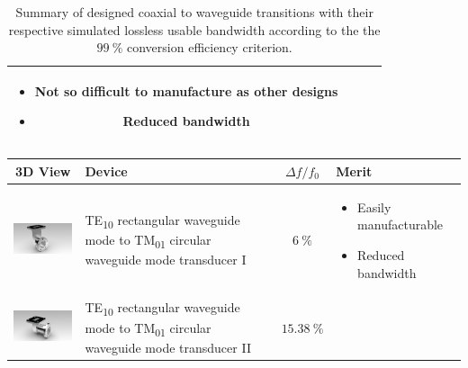 \documentclass[english,twoside]{article}
\newcommand\pro{\item[$+$]}
\newcommand\con{\item[$-$]}
\begin{document}
\begin{landscape}
\begin{table}[H]
{\begin{tabular}{c|l|c|l}
						\begin{minipage}{5cm} 
							\begin{itemize}
								\pro Not so difficult to manufacture as other designs
								\con Reduced bandwidth
							\end{itemize}
						\end{minipage}\\
						\hline
					\end{tabular}
				}			
				\caption{Summary of designed coaxial to waveguide transitions with their respective simulated lossless usable bandwidth according to the the $\SI{99}{\percent}$ conversion efficiency criterion.}
			\end{table}
			\newpage
			\begin{table}[H]
				\centering
				{\small
					\begin{tabular}{c|l|c|l}
						3D View & Device & $\Delta f / f_0$ & Merit\\
						\hline
						\includegraphics[width=3.5cm,valign=c,margin=3pt]{renders/wrToWcTM01_irises} & \begin{minipage}{7cm}TE\textsubscript{10} rectangular waveguide mode to TM\textsubscript{01} circular waveguide mode transducer I\end{minipage} & $\SI{6}{\percent}$ &
						\begin{minipage}{5cm} 
							\begin{itemize}
								\pro Easily manufacturable
								\con Reduced bandwidth
							\end{itemize}
						\end{minipage}\\
						\hline
						\includegraphics[width=3.5cm,valign=c,margin=3pt]{renders/wrToWcTM01} & \begin{minipage}{7cm}TE\textsubscript{10} rectangular waveguide mode to TM\textsubscript{01} circular waveguide mode transducer II\end{minipage}  & $\SI{15.38}{\percent}$ &
						\begin{minipage}{5cm} 
							\begin{itemize}

\end{itemize}
\end{minipage}
\end{tabular}}
\end{table}
\end{landscape}
\end{document}
